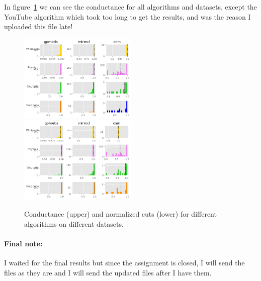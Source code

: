 \documentclass[letterpaper, 11pt]{article}
\newcommand{\1}{\mathds{1}}	%
\theoremstyle{definition}
\begin{document}
In figure~\ref{fig:conductance} we can see the conductance for all algorithms and datasets, except the YouTube algorithm which took too long to get the results, and was the reason I uploaded this file late!

\begin{figure}[h]
\centering
\includegraphics[width=0.5\textwidth]{conductance.png}
\includegraphics[width=0.5\textwidth]{ncs.png}
\captionsetup{justification=centering,margin=0.5cm}
\caption{Conductance (upper) and normalized cuts (lower) for different algorithms on different datasets.}
\label{fig:conductance}
\end{figure}

\paragraph{Final note:}I waited for the final results but since the assignment is closed, I will send the files as they are and I will send the updated files after I have them.

\newpage


\end{document}
